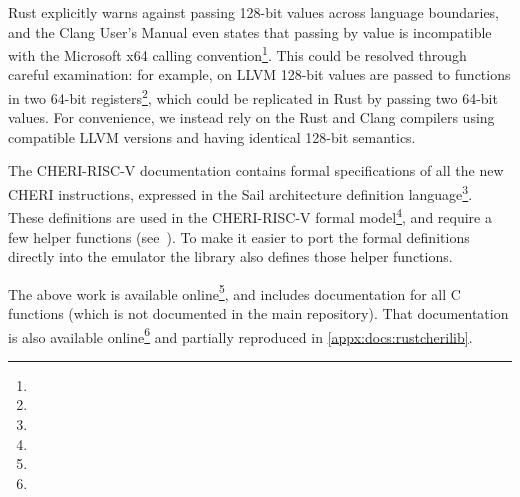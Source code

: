 Rust explicitly warns against passing 128-bit values across language boundaries, and the Clang User's Manual even states that passing  by value is incompatible with the Microsoft x64 calling convention\footnote{}.
This could be resolved through careful examination: for example, on LLVM 128-bit values are passed to functions in two 64-bit registers\footnote{}, which could be replicated in Rust by passing two 64-bit values.
For convenience, we instead rely on the Rust and Clang compilers using compatible LLVM versions and having identical 128-bit semantics.

The CHERI-RISC-V documentation contains formal specifications of all the new CHERI instructions, expressed in the Sail architecture definition  language\footnote{}.
These definitions are used in the CHERI-RISC-V formal model\footnote{}, and require a few helper functions (see~\cite[Chapter~8.2]{TR-951}).
To make it easier to port the formal definitions directly into the emulator the  library also defines those helper functions.

The above work is available online\footnote{}, and includes documentation for all C functions (which is not documented in the main repository).
That documentation is also available online\footnote{} and partially reproduced in \cref{appx:docs:rustcherilib}.

